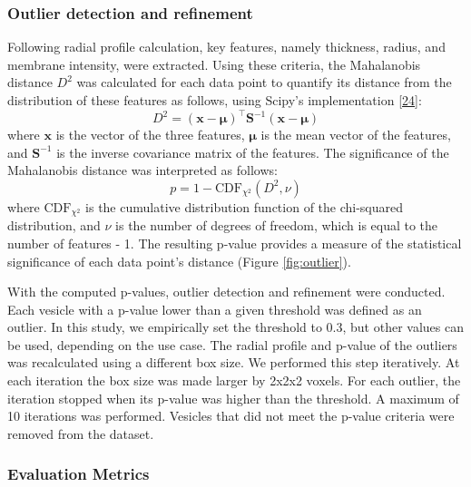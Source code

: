 \hypertarget{outlier-detection-and-refinement-1}{%
\subsubsection{Outlier detection and refinement}\label{outlier-detection-and-refinement-1}}

Following radial profile calculation, key features, namely thickness, radius, and membrane intensity, were extracted.
Using these criteria, the Mahalanobis distance \(D^2\) was calculated for each data point to quantify its distance from the distribution of these features as follows, using Scipy's implementation {[}\protect\hyperlink{ref-hFc1Q2c}{24}{]}:
\begin{equation}D^2 = (\mathbf{x} - \boldsymbol{\mu})^\top \mathbf{S}^{-1} (\mathbf{x} - \boldsymbol{\mu})\label{eq:mahalanobis-distance}\end{equation}
where \(\mathbf{x}\) is the vector of the three features, \(\boldsymbol{\mu}\) is the mean vector of the features, and \(\mathbf{S}^{-1}\) is the inverse covariance matrix of the features.
The significance of the Mahalanobis distance was interpreted as follows:
\begin{equation}p = 1 - \text{CDF}_{\chi^2}(D^2, \nu)\label{eq:p-value}\end{equation}
where \(\text{CDF}_{\chi^2}\) is the cumulative distribution function of the chi-squared distribution, and \(\nu\) is the number of degrees of freedom, which is equal to the number of features - 1.
The resulting p-value provides a measure of the statistical significance of each data point's distance (Figure \ref{fig:outlier}).

With the computed p-values, outlier detection and refinement were conducted.
Each vesicle with a p-value lower than a given threshold was defined as an outlier.
In this study, we empirically set the threshold to 0.3, but other values can be used, depending on the use case.
The radial profile and p-value of the outliers was recalculated using a different box size.
We performed this step iteratively.
At each iteration the box size was made larger by 2x2x2 voxels.
For each outlier, the iteration stopped when its p-value was higher than the threshold.
A maximum of 10 iterations was performed.
Vesicles that did not meet the p-value criteria were removed from the dataset.

\hypertarget{evaluation-metrics}{%
\subsubsection{Evaluation Metrics}\label{evaluation-metrics}}

